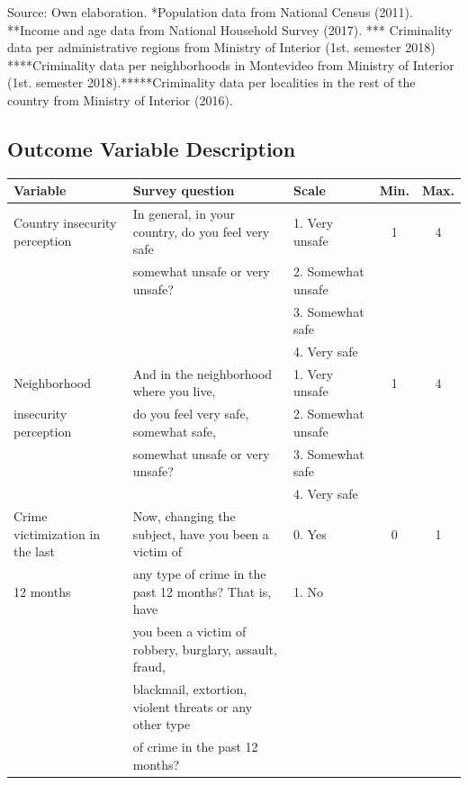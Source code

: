\documentclass[11pt]{article}
\begin{document}
\begin{landscape}
\begin{longtable}[htbp]{@{}p{1.2cm}p{1cm}p{1.5cm}p{1cm}p{1cm}p{1cm}p{1cm}p{1cm}p{1cm}p{1cm}p{1cm}p{1.2cm}p{1cm}p{1cm}@{}}
\bottomrule
\end{longtable}

Source: Own elaboration. *Population data from National Census (2011). **Income and age data from National Household Survey (2017). *** Criminality data per administrative regions from Ministry of Interior (1st. semester 2018) ****Criminality data per neighborhoods in Montevideo from Ministry of Interior (1st. semester 2018).*****Criminality data per localities in the rest of the country from Ministry of Interior (2016).
\end{landscape}
\restoregeometry

\begin{landscape}
\section{Outcome Variable Description}
\begin{tiny}
\begin{tabular}{lllcc}
\textbf{Variable }	&	\textbf{Survey question} 	&	\textbf{Scale}	&	\textbf{Min.}	&	\textbf{Max.}		\\	\hline
Country insecurity  perception	&	In general, in your country, do you feel very safe	&	1. Very unsafe 	&	1	&	4	\\
	&	somewhat unsafe or very unsafe?	&	2. Somewhat unsafe 	&		&		\\
	&		&	3. Somewhat safe 	&		&		\\
	&		&	4. Very safe 	&		&		\\\hline
Neighborhood 	&	And in the neighborhood where you live, 	&	1. Very unsafe 	&	1	&	4	\\
insecurity perception	&	do you feel very safe, somewhat safe,	&	2. Somewhat unsafe 	&		&		\\
	&	somewhat unsafe or very unsafe?	&	3. Somewhat safe 	&		&		\\
	&		&	4. Very safe 	&		&		\\\hline
Crime victimization in the last 	&	Now, changing the subject, have you been a victim of 	&	0. Yes	&	0	&	1	\\
12 months	&	any type of crime in the past 12 months? That is, have	&	1. No 	&		&		\\
	&	you been a victim of robbery, burglary, assault, fraud,	&		&		&		\\
	&	blackmail, extortion, violent threats or any other type	&		&		&		\\
	&	of crime in the past 12 months?	&		&		&		\\\hline

\end{tabular}
\end{tiny}
\end{landscape}
\end{document}
